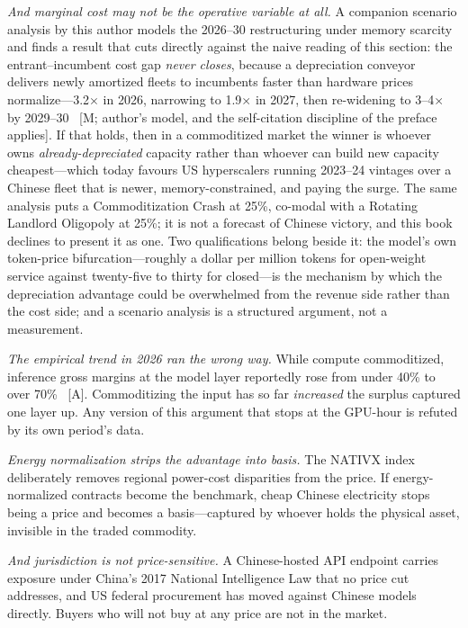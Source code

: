 \emph{And marginal cost may not be the operative variable at all.} A companion scenario analysis by this author models the 2026--30 restructuring under memory scarcity and finds a result that cuts directly against the naive reading of this section: the entrant--incumbent cost gap \emph{never closes}, because a depreciation conveyor delivers newly amortized fleets to incumbents faster than hardware prices normalize---3.2$\times$ in 2026, narrowing to 1.9$\times$ in 2027, then re-widening to 3--4$\times$ by 2029--30~\cite{matsuoka-memory} [M; author's model, and the self-citation discipline of the preface applies]. If that holds, then in a commoditized market the winner is whoever owns \emph{already-depreciated} capacity rather than whoever can build new capacity cheapest---which today favours US hyperscalers running 2023--24 vintages over a Chinese fleet that is newer, memory-constrained, and paying the surge. The same analysis puts a Commoditization Crash at 25\%, co-modal with a Rotating Landlord Oligopoly at 25\%; it is not a forecast of Chinese victory, and this book declines to present it as one. Two qualifications belong beside it: the model's own token-price bifurcation---roughly a dollar per million tokens for open-weight service against twenty-five to thirty for closed---is the mechanism by which the depreciation advantage could be overwhelmed from the revenue side rather than the cost side; and a scenario analysis is a structured argument, not a measurement.

\emph{The empirical trend in 2026 ran the wrong way.} While compute commoditized, inference gross margins at the model layer reportedly rose from under 40\% to over 70\%~\cite{value-capture} [A]. Commoditizing the input has so far \emph{increased} the surplus captured one layer up. Any version of this argument that stops at the GPU-hour is refuted by its own period's data.

\emph{Energy normalization strips the advantage into basis.} The NATIVX index deliberately removes regional power-cost disparities from the price. If energy-normalized contracts become the benchmark, cheap Chinese electricity stops being a price and becomes a basis---captured by whoever holds the physical asset, invisible in the traded commodity.

\emph{And jurisdiction is not price-sensitive.} A Chinese-hosted API endpoint carries exposure under China's 2017 National Intelligence Law that no price cut addresses, and US federal procurement has moved against Chinese models directly. Buyers who will not buy at any price are not in the market.

